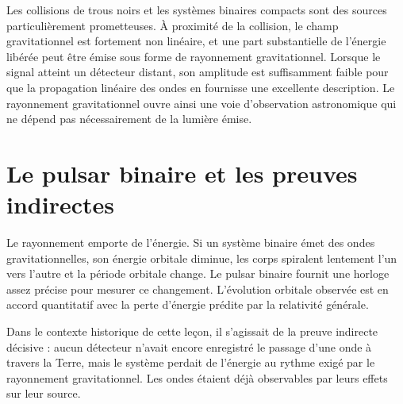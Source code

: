 Les collisions de trous noirs et les systèmes binaires compacts sont des sources particulièrement prometteuses. À proximité de la collision, le champ gravitationnel est fortement non linéaire, et une part substantielle de l’énergie libérée peut être émise sous forme de rayonnement gravitationnel. Lorsque le signal atteint un détecteur distant, son amplitude est suffisamment faible pour que la propagation linéaire des ondes en fournisse une excellente description. Le rayonnement gravitationnel ouvre ainsi une voie d’observation astronomique qui ne dépend pas nécessairement de la lumière émise.

\section{Le pulsar binaire et les preuves indirectes}

Le rayonnement emporte de l’énergie. Si un système binaire émet des ondes gravitationnelles, son énergie orbitale diminue, les corps spiralent lentement l’un vers l’autre et la période orbitale change. Le pulsar binaire fournit une horloge assez précise pour mesurer ce changement. L’évolution orbitale observée est en accord quantitatif avec la perte d’énergie prédite par la relativité générale.

Dans le contexte historique de cette leçon, il s’agissait de la preuve indirecte décisive : aucun détecteur n’avait encore enregistré le passage d’une onde à travers la Terre, mais le système perdait de l’énergie au rythme exigé par le rayonnement gravitationnel. Les ondes étaient déjà observables par leurs effets sur leur source.

\begin{classroomqa}
\end{classroomqa}

\begin{classroomqa}
\end{classroomqa}

